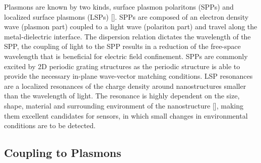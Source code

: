 Plasmons are known by two kinds, surface plasmon polaritons (SPPs) and localized surface plasmons (LSPs) [\cite{MaierBook}]. SPPs are composed of an electron density wave (plasmon part) coupled to a light wave (polariton part) and travel along the metal-dielectric interface. The dispersion relation dictates the wavelength  of the SPP, the coupling of light to the SPP results in a reduction of the free-space wavelength that is beneficial for electric field confinement. SPPs are commonly excited by 2D periodic grating structures as the periodic structure is able to provide the necessary in-plane wave-vector matching conditions. LSP resonances are a localized resonances of the charge density around nanostructures smaller than the wavelength of light. The resonance is highly dependent on the size, shape, material and surrounding environment of the nanostructure [\cite{Link1}], making them excellent candidates for sensors, in which small changes in environmental conditions are to be detected.

\subsection{Coupling to Plasmons}
\label{deriv}

